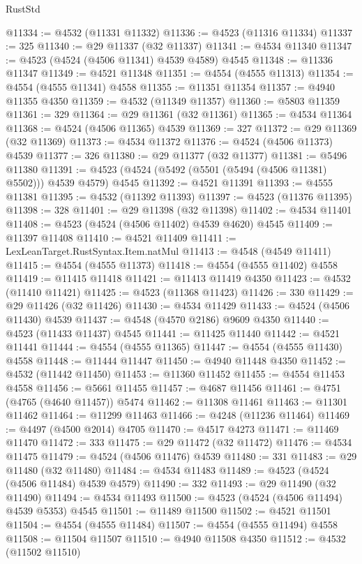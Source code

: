 \begin{lexlean}{RustStd}
\begin{coremodule}
@11334 := @4532 (@11331 @11332)
@11336 := @4523 (@11316 @11334)
@11337 := 325
@11340 := @29 @11337 (@32 @11337)
@11341 := @4534 @11340
@11347 := @4523 (@4524 (@4506 @11341) @4539 @4589) @4545
@11348 := @11336 @11347
@11349 := @4521 @11348
@11351 := @4554 (@4555 @11313)
@11354 := @4554 (@4555 @11341) @4558
@11355 := @11351 @11354
@11357 := @4940 @11355 @4350
@11359 := @4532 (@11349 @11357)
@11360 := @5803 @11359
@11361 := 329
@11364 := @29 @11361 (@32 @11361)
@11365 := @4534 @11364
@11368 := @4524 (@4506 @11365) @4539
@11369 := 327
@11372 := @29 @11369 (@32 @11369)
@11373 := @4534 @11372
@11376 := @4524 (@4506 @11373) @4539
@11377 := 326
@11380 := @29 @11377 (@32 @11377)
@11381 := @5496 @11380
@11391 := @4523 (@4524 (@5492 (@5501 (@5494 (@4506 @11381) @5502))) @4539 @4579) @4545
@11392 := @4521 @11391
@11393 := @4555 @11381
@11395 := @4532 (@11392 @11393)
@11397 := @4523 (@11376 @11395)
@11398 := 328
@11401 := @29 @11398 (@32 @11398)
@11402 := @4534 @11401
@11408 := @4523 (@4524 (@4506 @11402) @4539 @4620) @4545
@11409 := @11397 @11408
@11410 := @4521 @11409
@11411 := LexLeanTarget.RustSyntax.Item.natMul
@11413 := @4548 (@4549 @11411)
@11415 := @4554 (@4555 @11373)
@11418 := @4554 (@4555 @11402) @4558
@11419 := @11415 @11418
@11421 := @11413 @11419 @4350
@11423 := @4532 (@11410 @11421)
@11425 := @4523 (@11368 @11423)
@11426 := 330
@11429 := @29 @11426 (@32 @11426)
@11430 := @4534 @11429
@11433 := @4524 (@4506 @11430) @4539
@11437 := @4548 (@4570 @2186) @9609 @4350
@11440 := @4523 (@11433 @11437) @4545
@11441 := @11425 @11440
@11442 := @4521 @11441
@11444 := @4554 (@4555 @11365)
@11447 := @4554 (@4555 @11430) @4558
@11448 := @11444 @11447
@11450 := @4940 @11448 @4350
@11452 := @4532 (@11442 @11450)
@11453 := @11360 @11452
@11455 := @4554 @11453 @4558
@11456 := @5661 @11455
@11457 := @4687 @11456
@11461 := @4751 (@4765 (@4640 @11457)) @5474
@11462 := @11308 @11461
@11463 := @11301 @11462
@11464 := @11299 @11463
@11466 := @4248 (@11236 @11464)
@11469 := @4497 (@4500 @2014) @4705
@11470 := @4517 @4273
@11471 := @11469 @11470
@11472 := 333
@11475 := @29 @11472 (@32 @11472)
@11476 := @4534 @11475
@11479 := @4524 (@4506 @11476) @4539
@11480 := 331
@11483 := @29 @11480 (@32 @11480)
@11484 := @4534 @11483
@11489 := @4523 (@4524 (@4506 @11484) @4539 @4579)
@11490 := 332
@11493 := @29 @11490 (@32 @11490)
@11494 := @4534 @11493
@11500 := @4523 (@4524 (@4506 @11494) @4539 @5353) @4545
@11501 := @11489 @11500
@11502 := @4521 @11501
@11504 := @4554 (@4555 @11484)
@11507 := @4554 (@4555 @11494) @4558
@11508 := @11504 @11507
@11510 := @4940 @11508 @4350
@11512 := @4532 (@11502 @11510)

\end{coremodule}
\end{lexlean}
